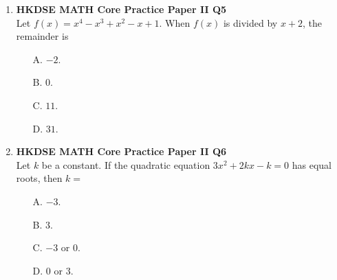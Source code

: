 \documentclass[12pt]{article}
\begin{document}
\begin{enumerate}
	\item \textbf{HKDSE MATH Core Practice Paper II Q5}\\
	Let $f(x) = x^4 - x^3 + x^2 - x + 1$. When $f(x)$ is divided by $x + 2$, the remainder is 
	\begin{enumerate}
		\item[A.] $-2$.
		\item[B.] $0$.
		\item[C.] $11$.
		\item[D.] $31$.
	\end{enumerate}

	\item \textbf{HKDSE MATH Core Practice Paper II Q6}\\
	Let $k$ be a constant. If the quadratic equation $3x^2 + 2kx - k = 0$ has equal roots, then $k = $
	\begin{enumerate}
		\item[A.] $-3$.
		\item[B.] $3$.
		\item[C.] $-3$ or $0$.
		\item[D.] $0$ or $3$.
	\end{enumerate}


\end{enumerate}
\end{document}
